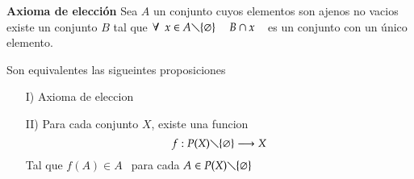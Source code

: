 \theoremstyle{definition}
\begin{definition}{\textbf{Axioma de elección}}
Sea $ A $ un conjunto cuyos elementos son ajenos no vacios existe un conjunto $ B $  tal que $ \forall \ \ x \in A \diagdown \lbrace \varnothing \rbrace  \ \ \ \ \ B \cap x \ \ \ $ es  un conjunto con un único elemento. 
\end{definition}
\begin{prop13}Son equivalentes las sigueintes proposiciones
\begin{itemize}
\item[I)]Axioma de eleccion
\item[II)]Para cada conjunto $ X $, existe una funcion $$ f: P(X)\diagdown \lbrace \varnothing \rbrace \longrightarrow X $$
Tal que $ f(A) \in A \ \ $ para cada $ A \in P(X) \diagdown \lbrace \varnothing  \rbrace $  
\end{itemize}
\end{prop13}
